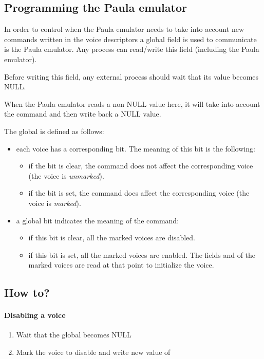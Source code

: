 \subsection{Programming the Paula emulator}

In order to control when the Paula emulator needs to take into account
new commands written in the voice descriptors a global 
field is used to communicate is the Paula emulator. Any process can
read/write this field (including the Paula emulator). 

Before writing this field, any external process should wait that its
value becomes NULL.

When the Paula emulator reads a non NULL value here, it will take into
account the command and then write back a NULL value.

The global  is defined as follows:
\begin{itemize}
\item each voice has a corresponding bit. The meaning of this bit is
  the following:
  \begin{itemize}
  \item if the bit is clear, the command does not affect the
    corresponding voice (the voice is \emph{unmarked}).
  \item if the bit is set, the command does affect the corresponding
    voice (the voice is \emph{marked}).
  \end{itemize}
\item a global bit indicates the meaning of the command:
  \begin{itemize}
  \item if this bit is clear, all the marked voices are disabled.
  \item if this bit is set, all the marked voices are enabled. The
    fields  and  of the marked voices are
    read at that point to initialize the voice.
  \end{itemize}
\end{itemize}

\subsection{How to?}

\paragraph{Disabling a voice}
\begin{enumerate}
\item Wait that the global  becomes NULL
\item Mark the voice to disable and write new value of 
\end{enumerate}

